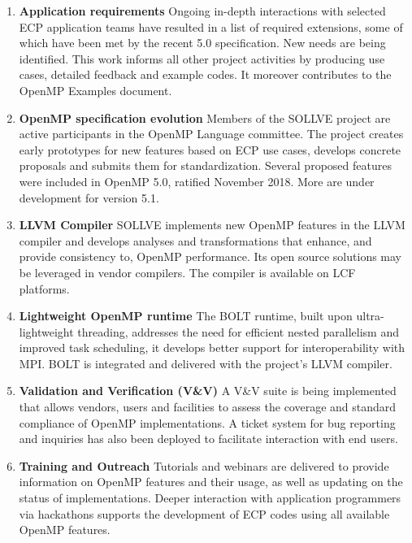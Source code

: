 \begin{enumerate}
\item {\bf Application requirements}
Ongoing in-depth interactions with selected ECP application teams have resulted in a list of required extensions, some of which have been met by the recent 5.0 specification.  New needs are being identified. This work informs all other project activities by producing use cases, detailed feedback and example codes. It moreover contributes to the OpenMP Examples document. 
\item {\bf OpenMP specification evolution}
Members of the SOLLVE project are active participants in the OpenMP Language committee.  The project creates early prototypes for new features based on ECP use cases, develops concrete proposals and submits them for standardization. Several proposed features  were included in OpenMP 5.0, ratified November 2018. More are under development for version 5.1.
\item {\bf LLVM  Compiler}
SOLLVE implements new OpenMP features in the LLVM compiler and develops analyses and transformations that enhance, and provide consistency to, OpenMP performance. Its open source solutions may be leveraged in vendor compilers.
The compiler is available on LCF platforms.
\item {\bf Lightweight OpenMP runtime}
The BOLT runtime, built upon ultra-lightweight threading, addresses the need for efficient nested parallelism and improved task scheduling, it develops better support for interoperability with MPI. BOLT is integrated and delivered with the project's LLVM compiler. 
\item {\bf Validation and Verification (V\&V)} 
A V\&V suite is being implemented that allows vendors, users and facilities to assess the coverage
and standard compliance of OpenMP implementations. A ticket system for bug reporting and inquiries has also been deployed to facilitate interaction with end users.
\item{\bf Training and Outreach}
 Tutorials and webinars are delivered to provide information on OpenMP features and their usage, as well as updating on the status of  %
 implementations. Deeper interaction with application programmers via hackathons supports the development of ECP codes using all available OpenMP features.
\end{enumerate}


